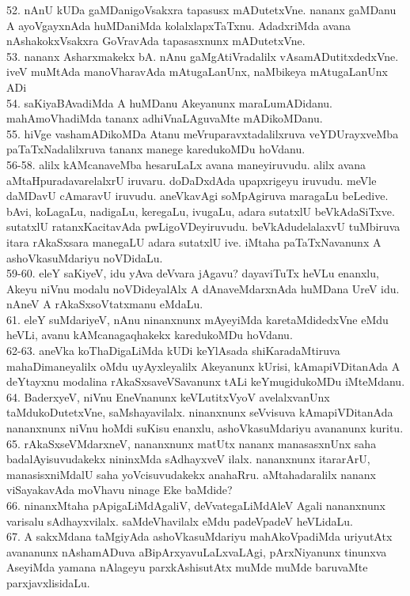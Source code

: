 \documentclass{article}
\begin{document}
52. nAnU kUDa gaMDanigoVsakxra tapasusx mADutetxVne. nananx gaMDanu A ayoVgayxnAda huMDaniMda kolalxlapxTaTxnu. AdadxriMda avana nAshakokxVsakxra GoVravAda tapasasxnunx mADutetxVne.\\
53. nananx Asharxmakekx bA. nAnu gaMgAtiVradalilx vAsamADutitxdedxVne. iveV muMtAda manoVharavAda mAtugaLanUnx, naMbikeya mAtugaLanUnx ADi\\
54. saKiyaBAvadiMda A huMDanu Akeyanunx maraLumADidanu. mahAmoVhadiMda tananx adhiVnaLAguvaMte mADikoMDanu.\\
55. hiVge vashamADikoMDa Atanu meVruparavxtadalilxruva veYDUrayxveMba paTaTxNadalilxruva tananx manege karedukoMDu hoVdanu.\\
56-58. alilx kAMcanaveMba hesaruLaLx avana maneyiruvudu. alilx avana aMtaHpuradavarelalxrU iruvaru. doDaDxdAda upapxrigeyu iruvudu. meVle daMDavU cAmaravU iruvudu. aneVkavAgi soMpAgiruva maragaLu beLedive. bAvi, koLagaLu, nadigaLu, keregaLu, ivugaLu, adara sutatxlU beVkAdaSiTxve. sutatxlU ratanxKacitavAda pwLigoVDeyiruvudu. beVkAdudelalaxvU tuMbiruva itara rAkaSxsara manegaLU adara sutatxlU ive. iMtaha paTaTxNavanunx A ashoVkasuMdariyu noVDidaLu.\\
59-60. eleY saKiyeV, idu yAva deVvara jAgavu? dayaviTuTx heVLu enanxlu, Akeyu niVnu modalu noVDideyalAlx A dAnaveMdarxnAda huMDana UreV idu. nAneV A rAkaSxsoVtatxmanu eMdaLu.\\
61. eleY suMdariyeV, nAnu ninanxnunx mAyeyiMda karetaMdidedxVne eMdu heVLi, avanu kAMcanagaqhakekx karedukoMDu hoVdanu.\\
62-63. aneVka koThaDigaLiMda kUDi keYlAsada shiKaradaMtiruva mahaDimaneyalilx oMdu uyAyxleyalilx Akeyanunx kUrisi, kAmapiVDitanAda A deYtayxnu modalina rAkaSxsaveVSavanunx tALi keYmugidukoMDu iMteMdanu.\\
64. BaderxyeV, niVnu EneVnanunx keVLutitxVyoV avelalxvanUnx taMdukoDutetxVne, saMshayavilalx. ninanxnunx seVvisuva kAmapiVDitanAda nananxnunx niVnu hoMdi suKisu enanxlu, ashoVkasuMdariyu avananunx kuritu.\\
65. rAkaSxseVMdarxneV, nananxnunx matUtx nananx manasasxnUnx saha badalAyisuvudakekx nininxMda sAdhayxveV ilalx. nananxnunx itararArU, manasisxniMdalU saha yoVcisuvudakekx anahaRru. aMtahadaralilx nananx viSayakavAda moVhavu ninage Eke baMdide?\\
66. ninanxMtaha pApigaLiMdAgaliV, deVvategaLiMdAleV Agali nananxnunx varisalu sAdhayxvilalx. saMdeVhavilalx eMdu padeVpadeV heVLidaLu.\\
67. A sakxMdana taMgiyAda ashoVkasuMdariyu mahAkoVpadiMda uriyutAtx avananunx nAshamADuva aBipArxyavuLaLxvaLAgi, pArxNiyanunx tinunxva AseyiMda yamana nAlageyu parxkAshisutAtx muMde muMde baruvaMte parxjavxlisidaLu.\\
\end{document}
